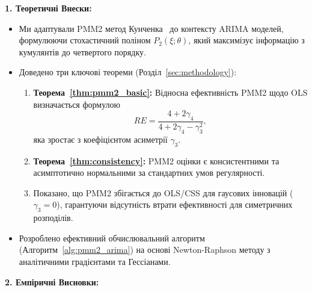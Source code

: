 \documentclass[12pt,a4paper]{article}
\begin{document}
	\textbf{1. Теоретичні Внески:}
	
	\begin{itemize}
		\item Ми адаптували PMM2 метод Кунченка~\cite{kunchenko2002polynomial} до контексту ARIMA моделей, формулюючи стохастичний поліном $P_2(\xi; \theta)$, який максимізує інформацію з кумулянтів до четвертого порядку.
		
		\item Доведено три ключові теореми (Розділ~\ref{sec:methodology}):
		\begin{enumerate}
			\item \textbf{Теорема~\ref{thm:pmm2_basic}:} Відносна ефективність PMM2 щодо OLS визначається формулою
			\begin{equation*}
				RE = \frac{4 + 2\gamma_4}{4 + 2\gamma_4 - \gamma_3^2},
			\end{equation*}
			яка зростає з коефіцієнтом асиметрії $\gamma_3$.
			
			\item \textbf{Теорема~\ref{thm:consistency}:} PMM2 оцінки є консистентними та асимптотично нормальними за стандартних умов регулярності.
			
			\item Показано, що PMM2 збігається до OLS/CSS для гаусових інновацій ($\gamma_3 = 0$), гарантуючи відсутність втрати ефективності для симетричних розподілів.
		\end{enumerate}
		
		\item Розроблено ефективний обчислювальний алгоритм (Алгоритм~\ref{alg:pmm2_arima}) на основі Newton-Raphson методу з аналітичними градієнтами та Гессіанами.
	\end{itemize}
	
	\textbf{2. Емпіричні Висновки:}
	
\end{document}
